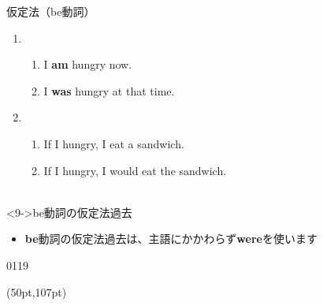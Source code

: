 \documentclass[aspectratio=169,xcolor={dvipsnames,table}]{beamer}
\begin{document}
\begin{frame}[plain,t]{仮定法（be動詞）}

\begin{enumerate}
 \item<1-> \begin{enumerate}
	\item<1-> I \textbf{am} hungry now.
	\item<2-> I \textbf{was} hungry at that time.
       \end{enumerate}
 \item<3->  \begin{enumerate}
	 \item<3-> If I  hungry, I  eat a sandwich.
\hfill{}\\
\hfill{}
	 \item<6-> If I  hungry, I would eat the sandwich.\\
\hfill{}\\
	      \hfill\visible<8->{{\scriptsize (いまはおなかがすいていない)}}
 \end{enumerate}
\end{enumerate}

\vspace{60pt}

\begin{block}<9->{be動詞の仮定法過去}\small

\begin{itemize}[square]
 \item \textbf{be}動詞の仮定法過去は、主語にかかわらず\textbf{were}を使います
\end{itemize}
\end{block}

\vspace{-10pt}

\hfill{\tiny 0119}\,{{\scriptsize {}}}
\begin{textblock*}{0.4\linewidth}(50pt,107pt)
\end{textblock*}
\end{frame}
\end{document}
